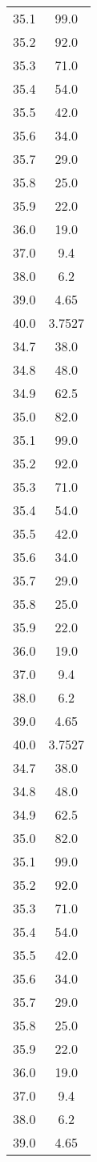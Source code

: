\begin{table}
\begin{tabular}{S[]S[]}
35.1 & 99.0\\
35.2 & 92.0\\
35.3 & 71.0\\
35.4 & 54.0\\
35.5 & 42.0\\
35.6 & 34.0\\
35.7 & 29.0\\
35.8 & 25.0\\
35.9 & 22.0\\
36.0 & 19.0\\
37.0 & 9.4\\
38.0 & 6.2\\
39.0 & 4.65\\
40.0 & 3.7527\\
34.7 & 38.0\\
34.8 & 48.0\\
34.9 & 62.5\\
35.0 & 82.0\\
35.1 & 99.0\\
35.2 & 92.0\\
35.3 & 71.0\\
35.4 & 54.0\\
35.5 & 42.0\\
35.6 & 34.0\\
35.7 & 29.0\\
35.8 & 25.0\\
35.9 & 22.0\\
36.0 & 19.0\\
37.0 & 9.4\\
38.0 & 6.2\\
39.0 & 4.65\\
40.0 & 3.7527\\
34.7 & 38.0\\
34.8 & 48.0\\
34.9 & 62.5\\
35.0 & 82.0\\
35.1 & 99.0\\
35.2 & 92.0\\
35.3 & 71.0\\
35.4 & 54.0\\
35.5 & 42.0\\
35.6 & 34.0\\
35.7 & 29.0\\
35.8 & 25.0\\
35.9 & 22.0\\
36.0 & 19.0\\
37.0 & 9.4\\
38.0 & 6.2\\
39.0 & 4.65\\

\end{tabular}
\end{table}
